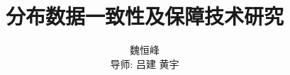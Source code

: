 \documentclass{beamer}
\title[]{分布数据一致性及保障技术研究}
\subtitle{}
\author[魏恒峰]{魏恒峰 \\导师: 吕建 \hspace{0.20cm} 黄宇}
\institute{南京大学软件所}
\theoremstyle{plain}
\begin{document}
\renewcommand\figurename{图} 
\renewcommand\tablename{表} 

\maketitle






\end{document}

